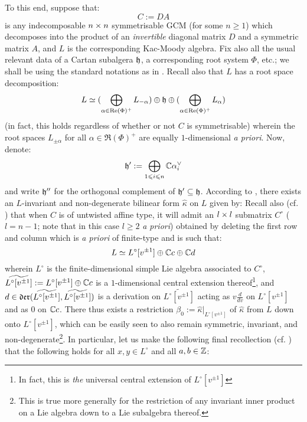             To this end, suppose that:
                $$C := D A$$
            is any indecomposable $n \x n$ symmetrisable GCM (for some $n \geq 1$) which decomposes into the product of an \textit{invertible} diagonal matrix $D$ and a symmetric matrix $A$, and $L$ is the corresponding Kac-Moody algebra. Fix also all the usual relevant data of a Cartan subalgera $\mathfrak{h}$, a corresponding root system $\Phi$, etc.; we shall be using the standard notations as in \cite[Chapter 5]{kac_infinite_dimensional_lie_algebras}. Recall also that $L$ has a root space decomposition:
                $$L \simeq (\bigoplus_{\alpha \in \operatorname{Re}(\Phi)^+} L_{-\alpha}) \oplus \mathfrak{h} \oplus (\bigoplus_{\alpha \in \operatorname{Re}(\Phi)^+} L_{\alpha})$$
            (in fact, this holds regardless of whether or not $C$ is symmetrisable) wherein the root spaces $L_{\pm \alpha}$ for all $\alpha \in \Re(\Phi)^+$ are equally $1$-dimensional \textit{a priori}. Now, denote:
                $$\mathfrak{h}' := \bigoplus_{1 \leqslant i \leqslant n} \mathbb{C} \alpha_i^{\vee}$$
            and write $\mathfrak{h}''$ for the orthogonal complement of $\mathfrak{h}' \subseteq \mathfrak{h}$. According to \cite[Theorem 2.2]{kac_infinite_dimensional_lie_algebras}, there exists an $L$-invariant and non-degenerate bilinear form $\hat{\kappa}$ on $L$ given by:
            Recall also (cf. \cite[Chapter 7]{kac_infinite_dimensional_lie_algebras}) that when $C$ is of untwisted affine type, it will admit an $l \x l$ submatrix $C^{\circ}$ ($l = n - 1$; note that in this case $l \geq 2$ \textit{a priori}) obtained by deleting the first row and column which is \textit{a priori} of finite-type and is such that:
                $$L \simeq L^{\circ}[v^{\pm 1}] \oplus \mathbb{C} c \oplus \mathbb{C} d$$
            wherein $L^{\circ}$ is the finite-dimensional simple Lie algebra associated to $C^{\circ}$, $\widetilde{L^{\circ}[v^{\pm 1}]} := L^{\circ}[v^{\pm 1}] \oplus \mathbb{C} c$ is a $1$-dimensional central extension thereof\footnote{In fact, this is \textit{the} universal central extension of $L^{\circ}[v^{\pm 1}]$}, and $d \in \mathfrak{der}(\widetilde{L^{\circ}[v^{\pm 1}]}, \widetilde{L^{\circ}[v^{\pm 1}]})$ is a derivation on $\widetilde{L^{\circ}[v^{\pm 1}]}$ acting as $v\frac{d}{dv}$ on $L^{\circ}[v^{\pm 1}]$ and as $0$ on $\mathbb{C} c$. There thus exists a restriction $\beta_0 := \hat{\kappa}|_{L^{\circ}[v^{\pm 1}]}$ of $\hat{\kappa}$ from $L$ down onto $L^{\circ}[v^{\pm 1}]$, which can be easily seen to also remain symmetric, invariant, and non-degenerate\footnote{This is true more generally for the restriction of any invariant inner product on a Lie algebra down to a Lie subalgebra thereof.}. In particular, let us make the following final recollection (cf. \cite[Section 7.5]{kac_infinite_dimensional_lie_algebras}) that the following holds for all $x, y \in L^{\circ}$ and all $a, b \in \mathbb{Z}$:

